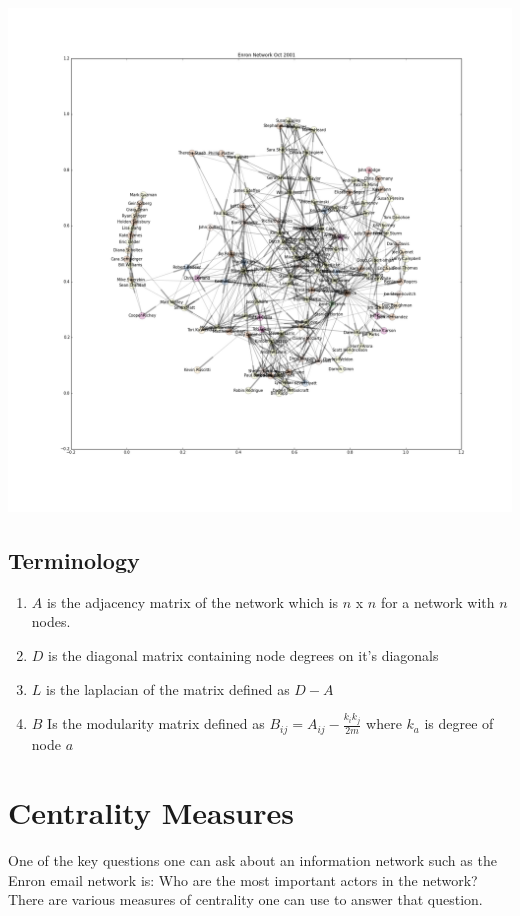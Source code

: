 \documentclass[12pt]{article}
\begin{document}
	\includegraphics[width=1\textwidth]{figureEnronOct2001}
	
	\subsection{Terminology}
	\begin{enumerate}
		\item $A$ is the adjacency matrix of the network which is $n$ x $n$ for a network with $n$ nodes.
		\item $D$ is the diagonal matrix containing node degrees on it's diagonals
		\item $L$ is the laplacian of the matrix defined as $D - A$
		\item $B$ Is the modularity matrix defined as $B_{ij} = A_{ij} - \frac{k_i k_j}{2m}$ where $k_a$ is degree of node $a$
	\end{enumerate}

\section{Centrality Measures} One of the key questions one can ask about an information network such as the Enron email network is: Who are the most important actors in the network? There are various measures of centrality one can use to answer that question.	
\end{document}
